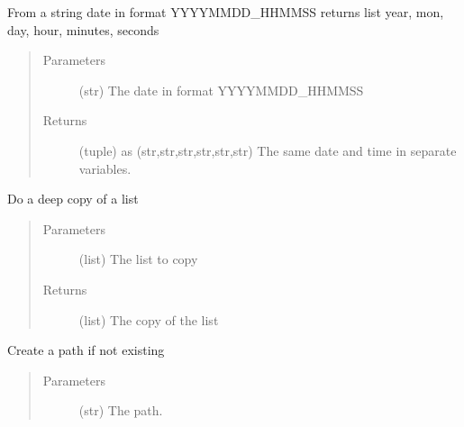 \documentclass[a4paper,10pt,english]{sphinxmanual}
\begin{document}

\begin{fulllineitems}
\label{\detokenize{apidoc_src/src:src.utilsSat.date_to_datetime}}
From a string date in format YYYYMMDD\_HHMMSS
returns list year, mon, day, hour, minutes, seconds
\begin{quote}\begin{description}
\item[{Parameters}] \leavevmode
{} \textendash{} (str) The date in format YYYYMMDD\_HHMMSS

\item[{Returns}] \leavevmode
(tuple) as (str,str,str,str,str,str)
The same date and time in separate variables.

\end{description}\end{quote}

\end{fulllineitems}


\begin{fulllineitems}
\label{\detokenize{apidoc_src/src:src.utilsSat.deepcopy_list}}
Do a deep copy of a list
\begin{quote}\begin{description}
\item[{Parameters}] \leavevmode
{} \textendash{} (list) The list to copy

\item[{Returns}] \leavevmode
(list) The copy of the list

\end{description}\end{quote}

\end{fulllineitems}


\begin{fulllineitems}
\label{\detokenize{apidoc_src/src:src.utilsSat.ensure_path_exists}}
Create a path if not existing
\begin{quote}\begin{description}
\item[{Parameters}] \leavevmode
{} \textendash{} (str) The path.

\end{description}\end{quote}

\end{fulllineitems}
\end{document}
